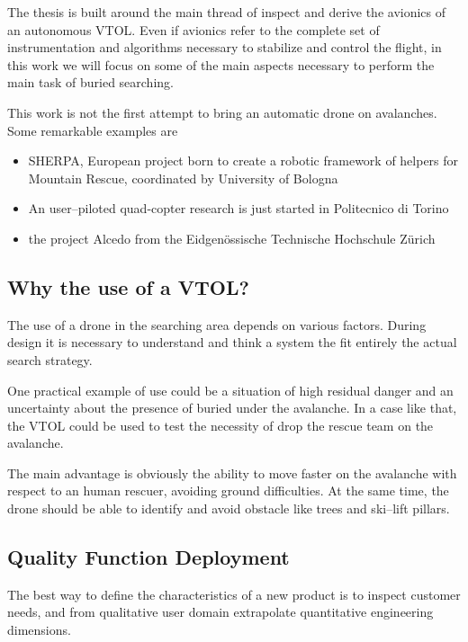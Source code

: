 The thesis is built around the main thread of inspect and derive the avionics of an autonomous VTOL. Even if avionics refer to the complete set of instrumentation and algorithms necessary to stabilize and control the flight, in this work we will focus on some of the main aspects necessary to perform the main task of buried searching.

This work is not the first attempt to bring an automatic drone on avalanches. Some remarkable examples are 
\begin{itemize}
\item SHERPA, European project born to create a robotic framework of helpers for Mountain Rescue, coordinated by University of Bologna
\item An user--piloted quad-copter research is just started in Politecnico di Torino
\item the project Alcedo from the Eidgen\"{o}ssische Technische Hochschule Z\"{u}rich\cite{projectAlcedoZurigo}
\end{itemize}

\subsection{Why the use of a VTOL?}
The use of a drone in the searching area depends on various factors. During design it is necessary to understand and think a system the fit entirely the actual search strategy.

One practical example of use could be a situation of high residual danger and an uncertainty about the presence of buried under the avalanche. In a case like that, the VTOL could be used to test the necessity of drop the rescue team on the avalanche.

The main advantage is obviously the ability to move faster on the avalanche with respect to an human rescuer, avoiding ground difficulties. At the same time, the drone should be able to identify and avoid obstacle like trees and ski--lift pillars.

\subsection{Quality Function Deployment}
The best way to define the characteristics of a new product is to inspect customer needs, and from qualitative user domain extrapolate quantitative engineering dimensions\cite{akao1994development}.

